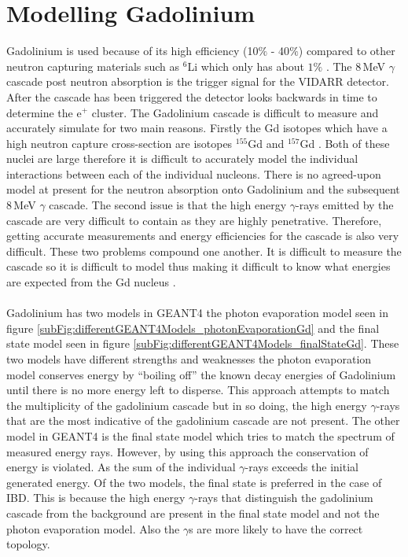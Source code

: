 \section{Modelling Gadolinium}\label{sec:GEANT4Simulation_modellingGadolinium}
Gadolinium is used because of its high efficiency (10$\%$ - 40$\%$) compared to other neutron capturing materials such as $^6$Li which only has about $1\%$ \cite{Abdushukurov_2010}. The 8\,MeV $\gamma$ cascade post neutron absorption is the trigger signal for the VIDARR detector. After the cascade has been triggered the detector looks backwards in time to determine the e$^+$ cluster. The Gadolinium cascade is difficult to measure and accurately simulate for two main reasons. Firstly the Gd isotopes which have a high neutron capture cross-section are isotopes $^{155}$Gd and $^{157}$Gd \cite{molnar_2004}. Both of these nuclei are large therefore it is difficult to accurately model the individual interactions between each of the individual nucleons. There is no agreed-upon model at present for the neutron absorption onto Gadolinium and the subsequent 8\,MeV $\gamma$ cascade. The second issue is that the high energy $\gamma$-rays emitted by the cascade are very difficult to contain as they are highly penetrative. Therefore, getting accurate measurements and energy efficiencies for the cascade is also very difficult. These two problems compound one another. It is difficult to measure the cascade so it is difficult to model thus making it difficult to know what energies are expected from the Gd nucleus \cite{molnar_2004}. 
\\\\Gadolinium has two models in GEANT4 the photon evaporation model seen in figure \ref{subFig:differentGEANT4Models_photonEvaporationGd} and the final state model seen in figure \ref{subFig:differentGEANT4Models_finalStateGd}. These two models have different strengths and weaknesses the photon evaporation model conserves energy by ``boiling off'' the known decay energies of Gadolinium until there is no more energy left to disperse. This approach attempts to match the multiplicity of the gadolinium cascade but in so doing, the high energy $\gamma$-rays that are the most indicative of the gadolinium cascade are not present. The other model in GEANT4 is the final state model which tries to match the spectrum of measured energy rays. However, by using this approach the conservation of energy is violated. As the sum of the individual $\gamma$-rays exceeds the initial generated energy. Of the two models, the final state is preferred in the case of IBD. This is because the high energy $\gamma$-rays that distinguish the gadolinium cascade from the background are present in the final state model and not the photon evaporation model. Also the $\gamma$s are more likely to have the correct topology. 

